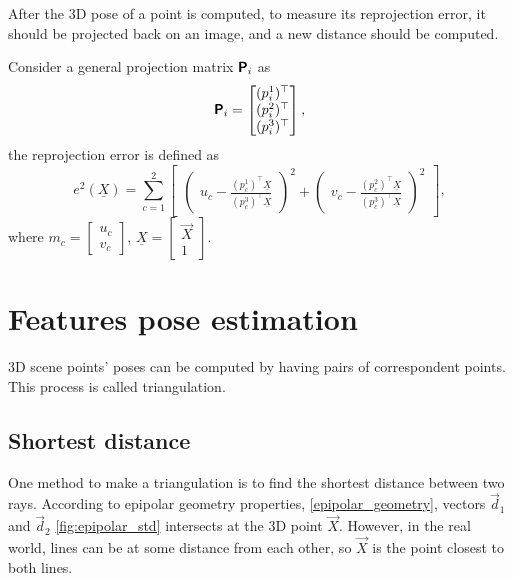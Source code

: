 After the 3D pose of a point is computed, to measure its reprojection error, it should be projected back on an image, and a new distance should be computed.

Consider a general projection matrix $\pmb{\mathsf{P}}_i$ as
\begin{equation}
    \label{eq:p_general}
    \pmb{\mathsf{P}}_i = \begin{bmatrix} (p_i^1)^\top \\ (p_i^2)^\top \\ (p_i^3)^\top \end{bmatrix},
\end{equation}
the reprojection error is defined as 
\begin{equation}
    e^2(\underline{X}) = \sum_{c=1}^{2}{  
    \begin{bmatrix}
        \begin{pmatrix}
            u_c - \frac{(p_c^1)^\top \underline{X}}{(p_c^3)^\top \underline{X}}
        \end{pmatrix}^2 + 
        \begin{pmatrix}
            v_c - \frac{(p_c^2)^\top \underline{X}}{(p_c^3)^\top \underline{X}}
        \end{pmatrix}^2
    \end{bmatrix}
    },
\end{equation}
where $m_c = \begin{bmatrix} u_c \\ v_c \end{bmatrix}$, $\underline{X} = \begin{bmatrix} \vec{X} \\ 1 \end{bmatrix}$.

\section{Features pose estimation}

3D scene points' poses can be computed by having pairs of correspondent points.
This process is called triangulation.

\subsection{Shortest distance}
One method to make a triangulation is to find the shortest distance between two rays.
According to epipolar geometry properties, \autoref{epipolar_geometry}, vectors $\vec{d}_1$ and $\vec{d}_2$ \autoref{fig:epipolar_std} intersects at the 3D point $\vec{X}$.
However, in the real world, lines can be at some distance from each other, so $\vec{X}$ is the point closest to both lines.

